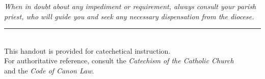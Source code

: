 \documentclass[11pt]{article}
\begin{document}
\vspace{1em}
\begin{center}
\textit{When in doubt about any impediment or requirement, always consult
your parish priest, who will guide you and seek any necessary
dispensation from the diocese.}
\end{center}

\vfill
\begin{center}
\rule{0.4\textwidth}{0.6pt}\\
\vspace{0.4em}
\small This handout is provided for catechetical instruction.\\
For authoritative reference, consult the \emph{Catechism of the Catholic Church}\\
and the \emph{Code of Canon Law}.
\end{center}
\end{document}
